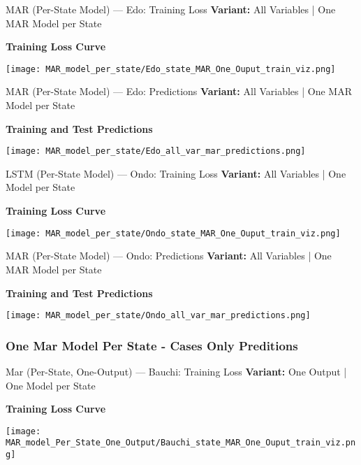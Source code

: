 \documentclass{beamer}
\begin{document}
\begin{frame}{MAR (Per-State Model) — Edo: Training Loss}
\textbf{Variant:} All Variables | One MAR Model per State
\vspace{0.5em}

\textbf{Training Loss Curve}
\begin{center}
    \texttt{[image: MAR\_model\_per\_state/Edo\_state\_MAR\_One\_Ouput\_train\_viz.png]}
\end{center}
\end{frame}

\begin{frame}{MAR (Per-State Model) — Edo: Predictions}
\textbf{Variant:} All Variables | One MAR Model per State
\vspace{0.5em}

\textbf{Training and Test Predictions}
\begin{center}
    \texttt{[image: MAR\_model\_per\_state/Edo\_all\_var\_mar\_predictions.png]}
\end{center}
\end{frame}

\begin{frame}{LSTM (Per-State Model) — Ondo: Training Loss}
\textbf{Variant:} All Variables | One Model per State
\vspace{0.5em}

\textbf{Training Loss Curve}
\begin{center}
    \texttt{[image: MAR\_model\_per\_state/Ondo\_state\_MAR\_One\_Ouput\_train\_viz.png]}
\end{center}
\end{frame}

\begin{frame}{MAR (Per-State Model) — Ondo: Predictions}
\textbf{Variant:} All Variables | One MAR Model per State
\vspace{0.5em}

\textbf{Training and Test Predictions}
\begin{center}
    \texttt{[image: MAR\_model\_per\_state/Ondo\_all\_var\_mar\_predictions.png]}
\end{center}
\end{frame}
%
\subsubsection{One Mar Model Per State - Cases Only Preditions}
\begin{frame}{Mar (Per-State, One-Output) — Bauchi: Training Loss}
\textbf{Variant:} One Output | One Model per State
\vspace{0.5em}

\textbf{Training Loss Curve}
\begin{center}
    \texttt{[image: MAR\_model\_Per\_State\_One\_Output/Bauchi\_state\_MAR\_One\_Ouput\_train\_viz.png]}
\end{center}
\end{frame}
\end{document}
